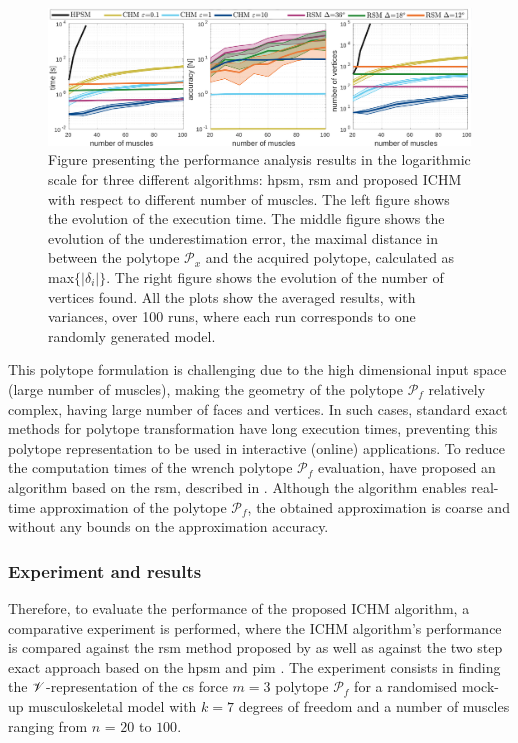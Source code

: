 \begin{figure}[!t]
    \centering
    \includegraphics[width=\linewidth]{Papers/images/one_auto_new5_these}
    \caption{{Figure presenting the performance analysis results in the logarithmic scale for three different algorithms: \gls{hpsm}, \gls{rsm} and proposed ICHM with respect to different number of muscles. The left figure shows the evolution of the execution time. The middle figure shows the evolution of the underestimation error, the maximal distance in between the polytope $\mathcal{P}_x$ and the acquired polytope, calculated as max$\{|\delta_{i}|\}$. The right figure shows the evolution of the number of vertices found. All the plots show the averaged results, with variances, over 100 runs, where each run corresponds to one randomly generated model.}}
    \label{fig:performance_results}
\end{figure}
This polytope formulation is challenging due to the high dimensional input space (large number of muscles), making the geometry of the polytope $\mathcal{P}_f$ relatively complex, having large number of faces and vertices. In such cases, standard exact methods for polytope transformation have long execution times, preventing this polytope representation to be used in interactive (online) applications. To reduce the computation times of the wrench polytope $\mathcal{P}_f$ evaluation, \citet{carmichael_towards_2011} have proposed an algorithm based on the \gls{rsm}, described in . Although the algorithm enables real-time approximation of the polytope $\mathcal{P}_f$, the obtained approximation is coarse and without any bounds on the approximation accuracy. 


\subsubsection{Experiment and results}
Therefore, to evaluate the performance of the proposed ICHM algorithm, a comparative experiment is
performed, where the ICHM algorithm's performance is compared against the \gls{rsm} method proposed by \citet{carmichael_towards_2011} as well as against the two step exact approach based on the \gls{hpsm} \cite{hyper_psm} and \gls{pim} \cite{bremner_fukuda_marzetta_1998}. The experiment consists in finding the $\mathscr{V}$-representation of the \gls{cs} force $m=3$ polytope $\mathcal{P}_f$ for a randomised mock-up musculoskeletal model with $k\!=\!7$ degrees of freedom and a number of muscles ranging from $n$ = $20$ to $100$. 

